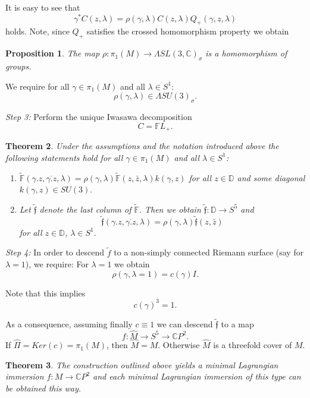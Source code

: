 \documentclass[a4paper,11pt]{amsart}
\newtheorem{theorem}{Theorem}[section]
\newtheorem{proposition}[theorem]{Proposition}
\theoremstyle{definition}
\numberwithin{equation}{section}
\newcommand{\C}{\mathbb{C}}
\newcommand{\D}{\mathbb{D}}
\newcommand{\F}{\mathbb{F}}
\newcommand{\f}{\mathfrak{f}}
\begin{document}
 It is easy to see that
 $$ \gamma^*C(z,\lambda) = \rho(\gamma,\lambda) C(z, \lambda) Q_+(\gamma,z, \lambda)$$
 holds.
Note, since $Q_+$ satisfies the crossed homomorphism property  we obtain

\begin{proposition}
The map $\rho: \pi_1(M) \rightarrow  \Lambda SL(3,\C)_{\sigma}$ is a homomorphism of groups.
\end{proposition}
 We require for all $\gamma \in \pi_1(M)$ and all $\lambda \in S^1$: 
 $$ \rho(\gamma,\lambda) \in  \Lambda SU(3)_{\sigma}.$$
 
{\it Step 3:} Perform the unique Iwasawa decomposition 
$$ C = \F L_+.$$

\begin{theorem}
 Under the assumptions and the notation introduced above the following statements hold for all $\gamma \in \pi_1(M)$ and all $\lambda \in S^1$:
 \begin{enumerate}
     \item $\tilde{\F}(\gamma.z, \overline{\gamma.z}, \lambda) = \rho(\gamma,\lambda)  \tilde{\F}(z, \bar z, \lambda) k(\gamma,z)$
     for all $z\in \D$ and some diagonal $k(\gamma,z) \in SU(3).$
     \item Let $\tilde{\f}$ denote the last column of $\tilde{\F}.$
      Then we obtain $\tilde{\f}: \D \rightarrow S^5$ and 
      $$\tilde{\f}(\gamma.z, \overline{\gamma.z}, \lambda) = \rho(\gamma,\lambda) \tilde{\f}(z, \bar{z})$$ for all $z\in \D$, $\lambda \in S^1.$ 
 \end{enumerate}
 \end{theorem}
 \vspace{4mm}
 
 {\it Step 4:} In order to descend $\tilde{f}$ to a non-simply connected Riemann surface (say for $\lambda=1$), we require:
 For $\lambda = 1$  we obtain  
 $$\rho(\gamma, \lambda = 1) =  c(\gamma) I.$$
 
 Note that this implies $$ c(\gamma)^3 = 1.$$

 
As a consequence, assuming finally $ c \equiv 1$ 
 we can descend $\tilde{\f}$ to a map $$f : \hat{M} \rightarrow S^5 \rightarrow \C P^2.$$
 If $ \hat{\Pi} = Ker(c) = \pi_1(M)$, then $\hat{M} = M$. Otherwise $\hat{M}$ is a threefold cover of $M$.
 
 \begin{theorem}\label{thm:cons-mli}
The construction outlined above yields a minimal Lagrangian immersion 
 $f : M \rightarrow \C P^2$ and each minimal Lagrangian immersion of this type can be obtained this way.
 \end{theorem}
\end{document}
